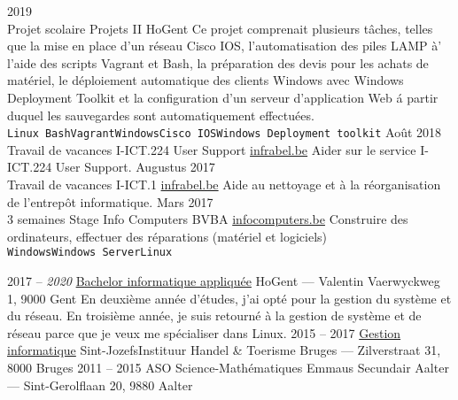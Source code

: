 \documentclass[9pt]{developercv} %
\begin{document}
\begin{entrylist}
	\entry
		{2019\\\footnotesize{Projet scolaire}}
		{Projets II}
		{HoGent}
		{Ce projet comprenait plusieurs t\^{a}ches, telles que la mise en place d'un r\'{e}seau Cisco IOS, l'automatisation des piles LAMP \`{a}' l'aide des scripts Vagrant et Bash, la pr\'{e}paration des devis pour les achats de mat\'{e}riel, le d\'{e}ploiement automatique des clients Windows avec Windows Deployment Toolkit et la configuration d'un serveur d'application Web \'{a} partir duquel les sauvegardes sont automatiquement effectu\'{e}es.
		\\ \texttt{Linux Bash}\slashsep\texttt{Vagrant}\slashsep\texttt{Windows}\slashsep\texttt{Cisco IOS}\slashsep\texttt{Windows Deployment toolkit}}
	\entry
	    {Ao\^{u}t 2018\\\footnotesize{Travail de vacances}}
	    {I-ICT.224 User Support}
	    {\href{https://www.infrabel.be/}{infrabel.be}}
	    {Aider sur le service I-ICT.224 User Support.}
	\entry
	    {Augustus 2017\\\footnotesize{Travail de vacances}}
	    {I-ICT.1}
	    {\href{https://www.infrabel.be/}{infrabel.be}}
	    {Aide au nettoyage et à la réorganisation de l'entrepôt informatique.}
	\entry
		{Mars 2017\\\footnotesize{3 semaines}}
		{Stage Info Computers BVBA}
		{\href{https://www.infocomputers.be/}{infocomputers.be}}
		{Construire des ordinateurs, effectuer des réparations (matériel et logiciels)\\
		\texttt{Windows}\slashsep\texttt{Windows Server}\slashsep\texttt{Linux}}
\end{entrylist}



\begin{entrylist}
	\entry
		{2017 -- \textit{2020}}
		{\href{https://www.hogent.be/opleidingen/bachelors/toegepaste-informatica/}{Bachelor informatique appliqu\'{e}e}}
		{HoGent --- Valentin Vaerwyckweg 1, 9000 Gent}
		{En deuxi\`{e}me année d'\'{e}tudes, j'ai opt\'{e} pour la gestion du syst\`{e}me et du r\'{e}seau. En troisi\`{e}me ann\'{e}e, je suis retourn\'{e} \`{a} la gestion de syst\`{e}me et de r\'{e}seau parce que je veux me sp\'{e}cialiser dans Linux. }
	\entry
		{2015 -- 2017}
		{\href{https://www.sintjozefbrugge.be/5e-en-6e-netwerken-en-it/}{Gestion informatique}}
		{Sint-JozefsInstituur Handel \& Toerisme Bruges --- Zilverstraat 31, 8000 Bruges}
		{}
	\entry
		{2011 -- 2015}
		{ASO Science-Mathématiques}
		{Emmaus Secundair Aalter --- Sint-Gerolflaan 20, 9880 Aalter}
		{ }
\end{entrylist}
\end{document}
